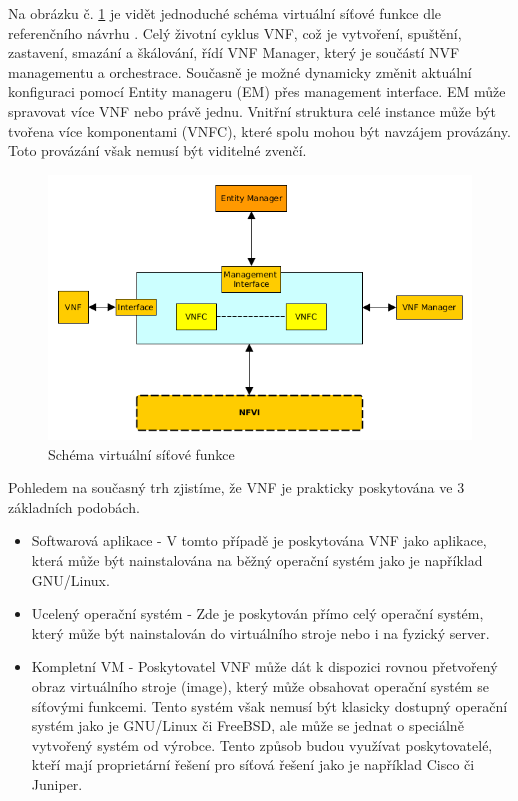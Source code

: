 Na obrázku č. \ref{fig:VNF} je vidět jednoduché schéma virtuální síťové funkce dle referenčního návrhu \cite{NFV_VNF}. Celý životní cyklus VNF, což je vytvoření, spuštění, zastavení, smazání a škálování, řídí VNF Manager, který je součástí NVF managementu a orchestrace. Současně je možné dynamicky změnit aktuální konfiguraci pomocí Entity manageru (EM) přes management interface. EM může spravovat více VNF nebo právě jednu. Vnitřní struktura celé instance může být tvořena více komponentami (VNFC), které spolu mohou být navzájem provázány. Toto provázání však nemusí být viditelné zvenčí.

\begin{figure}[h]
\begin{centering}
\includegraphics[scale=0.67]{images/VNF}
\par\end{centering}
\caption{Schéma virtuální síťové funkce\label{fig:VNF}}
\end{figure}

Pohledem na současný trh zjistíme, že VNF je prakticky poskytována ve 3 základních podobách.

\begin{itemize}
\item Softwarová aplikace - V tomto případě je poskytována VNF jako aplikace, která může být nainstalována na běžný operační systém jako je například GNU/Linux.
\item Ucelený operační systém - Zde je poskytován přímo celý operační systém, který může být nainstalován do virtuálního stroje nebo i na fyzický server.
\item Kompletní VM - Poskytovatel VNF může dát k dispozici rovnou přetvořený obraz virtuálního stroje (image), který může obsahovat operační systém se síťovými funkcemi. Tento systém však nemusí být klasicky dostupný operační systém jako je GNU/Linux či FreeBSD, ale může se jednat o speciálně vytvořený systém od výrobce. Tento způsob budou využívat poskytovatelé, kteří mají proprietární řešení pro síťová řešení jako je například Cisco či Juniper.
\end{itemize}

